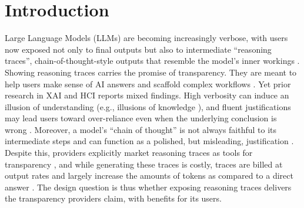 \documentclass[acmlarge,review=true, anonymous=true]{acmart}
\begin{document}
\section{Introduction}
Large Language Models (LLMs) are becoming increasingly verbose, with users now exposed not only to final outputs but also to intermediate ``reasoning traces'', chain-of-thought-style outputs that resemble the model's inner workings \cite{barez2025chain}. Showing reasoning traces carries the promise of transparency. They are meant to help users make sense of AI answers and scaffold complex workflows \cite{6645235}. Yet prior research in XAI and HCI reports mixed findings. High verbosity can induce an illusion of understanding (e.g., illusions of knowledge \cite{fisher2021harder}), and fluent justifications may lead users toward over-reliance even when the underlying conclusion is wrong \cite{10.1145/3397481.3450639}. Moreover, a model's ``chain of thought'' is not always faithful to its intermediate steps and can function as a polished, but misleading, justification \cite{10.5555/3666122.3669397,lindsey2025biology, barez2025chain}. Despite this, providers explicitly market reasoning traces as tools for transparency \cite{}, and while generating these traces is costly, traces are billed at output rates and largely increase the amounts of tokens as compared to a direct answer \cite{}. The design question is thus whether exposing reasoning traces delivers the transparency providers claim, with benefits for its users.
\end{document}

